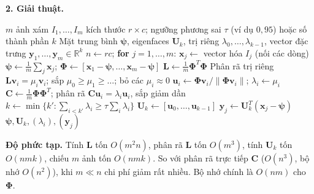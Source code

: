 \textbf{2. Giải thuật.}
\begin{algorithm}[ht]
\caption{Rút trích vector đặc trưng PCA cho tập ảnh mặt người}
\label{alg:w8_eigenfaces}
\begin{algorithmic}[1]
\Require $m$ ảnh xám $I_1, \ldots, I_m$ kích thước $r \times c$; ngưỡng phương sai $\tau$ (ví dụ $0{,}95$) hoặc số thành phần $k$
\Ensure Mặt trung bình $\boldsymbol{\psi}$, eigenfaces $\mathbf{U}_k$, trị riêng $\lambda_0, \ldots, \lambda_{k-1}$, vector đặc trưng $\mathbf{y}_1, \ldots, \mathbf{y}_m \in \mathbb{R}^k$
\State $n \gets rc$; \quad \textbf{for} $j = 1, \ldots, m$: $\mathbf{x}_j \gets$ vector hóa $I_j$ (nối các dòng) 
\State $\boldsymbol{\psi} \gets \frac{1}{m}\sum_{j}\mathbf{x}_j$; \quad $\boldsymbol{\Phi} \gets [\mathbf{x}_1 - \boldsymbol{\psi}, \ldots, \mathbf{x}_m - \boldsymbol{\psi}]$
    \State $\mathbf{L} \gets \frac{1}{m}\boldsymbol{\Phi}^T\boldsymbol{\Phi}$ 
    \State Phân rã trị riêng $\mathbf{L}\mathbf{v}_i = \mu_i\mathbf{v}_i$; sắp $\mu_0 \ge \mu_1 \ge \ldots$; bỏ các $\mu_i \approx 0$
    \State $\mathbf{u}_i \gets \boldsymbol{\Phi}\mathbf{v}_i / \|\boldsymbol{\Phi}\mathbf{v}_i\|$; \quad $\lambda_i \gets \mu_i$ 
\Else
    \State $\mathbf{C} \gets \frac{1}{m}\boldsymbol{\Phi}\boldsymbol{\Phi}^T$; phân rã $\mathbf{C}\mathbf{u}_i = \lambda_i\mathbf{u}_i$, sắp giảm dần
\EndIf
{}
    \State $k \gets \min\big\{k' : \sum_{i<k'}\lambda_i \ge \tau\sum_i\lambda_i\big\}$
\EndIf
\State $\mathbf{U}_k \gets [\mathbf{u}_0, \ldots, \mathbf{u}_{k-1}]$
    \State $\mathbf{y}_j \gets \mathbf{U}_k^T(\mathbf{x}_j - \boldsymbol{\psi})$ 
\EndFor
\State \Return $\boldsymbol{\psi}, \mathbf{U}_k, (\lambda_i), (\mathbf{y}_j)$
\end{algorithmic}
\end{algorithm}

\textbf{Độ phức tạp.} Tính $\mathbf{L}$ tốn $O(m^2 n)$, phân rã $\mathbf{L}$ tốn $O(m^3)$, tính $\mathbf{U}_k$ tốn $O(nmk)$, chiếu $m$ ảnh tốn $O(nmk)$. So với phân rã trực tiếp $\mathbf{C}$ ($O(n^3)$, bộ nhớ $O(n^2)$), khi $m \ll n$ chi phí giảm rất nhiều. Bộ nhớ chính là $O(nm)$ cho $\boldsymbol{\Phi}$.

